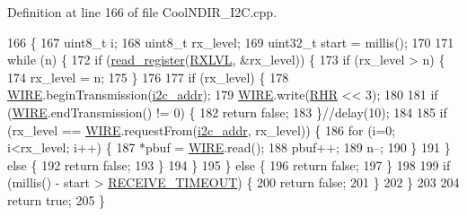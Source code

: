 Definition at line 166 of file Cool\+N\+D\+I\+R\+\_\+\+I2\+C.\+cpp.


\begin{DoxyCode}
166                                                   \{
167     uint8\_t  i;
168     uint8\_t  rx\_level;
169     uint32\_t start = millis();
170 
171     \textcolor{keywordflow}{while} (n) \{
172         \textcolor{keywordflow}{if} (\hyperlink{class_n_d_i_r___i2_c_aa72058e6e7c6174b14466fee4b2df1e0}{read\_register}(\hyperlink{_cool_n_d_i_r___i2_c_8cpp_add0ecaba99087df56028e00da8d13693}{RXLVL}, &rx\_level)) \{
173             \textcolor{keywordflow}{if} (rx\_level > n) \{
174                 rx\_level = n;
175             \}
176 
177             \textcolor{keywordflow}{if} (rx\_level) \{
178                 \hyperlink{_cool_n_d_i_r___i2_c_8cpp_a5fb65319d8f31c75826267805bb435d1}{WIRE}.beginTransmission(\hyperlink{class_n_d_i_r___i2_c_aac12069dd5a86a9ec6aa31ac9a44aabe}{i2c\_addr});
179                 \hyperlink{_cool_n_d_i_r___i2_c_8cpp_a5fb65319d8f31c75826267805bb435d1}{WIRE}.write(\hyperlink{_cool_n_d_i_r___i2_c_8cpp_aab8f9708ef3e7fe91563ea133063e94f}{RHR} << 3);
180 
181                 \textcolor{keywordflow}{if} (\hyperlink{_cool_n_d_i_r___i2_c_8cpp_a5fb65319d8f31c75826267805bb435d1}{WIRE}.endTransmission() != 0) \{
182                     \textcolor{keywordflow}{return} \textcolor{keyword}{false};
183                 \}\textcolor{comment}{//delay(10);}
184 
185                 \textcolor{keywordflow}{if} (rx\_level == \hyperlink{_cool_n_d_i_r___i2_c_8cpp_a5fb65319d8f31c75826267805bb435d1}{WIRE}.requestFrom(\hyperlink{class_n_d_i_r___i2_c_aac12069dd5a86a9ec6aa31ac9a44aabe}{i2c\_addr}, rx\_level)) \{
186                     \textcolor{keywordflow}{for} (i=0; i<rx\_level; i++) \{
187                        *pbuf = \hyperlink{_cool_n_d_i_r___i2_c_8cpp_a5fb65319d8f31c75826267805bb435d1}{WIRE}.read();
188                         pbuf++;
189                         n--;
190                     \}
191                 \} \textcolor{keywordflow}{else} \{
192                     \textcolor{keywordflow}{return} \textcolor{keyword}{false};
193                 \}
194             \}
195         \} \textcolor{keywordflow}{else} \{
196             \textcolor{keywordflow}{return} \textcolor{keyword}{false};
197         \}
198 
199         \textcolor{keywordflow}{if} (millis() - start > \hyperlink{_cool_n_d_i_r___i2_c_8cpp_a4c69942f01447fa7563c5726c7d8abf2}{RECEIVE\_TIMEOUT}) \{
200             \textcolor{keywordflow}{return} \textcolor{keyword}{false};
201         \}
202     \}
203 
204     \textcolor{keywordflow}{return} \textcolor{keyword}{true};
205 \}
\end{DoxyCode}
